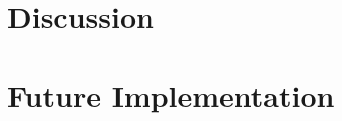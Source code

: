 \documentclass[USenglish]{uit-thesis}
\begin{document}
\section{Discussion}
\label{sec:discussion}
%

\section{Future Implementation}
\label{sec:future_implementation}
\end{document}
